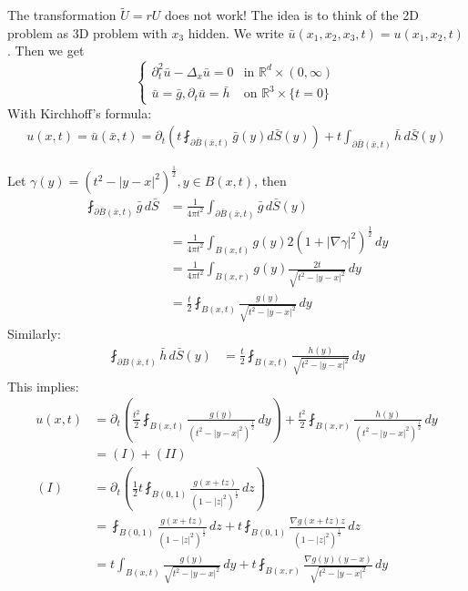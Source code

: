 \documentclass{report}
\theoremstyle{tommy}
\begin{document}
  The transformation \(\tilde U = r U\) does not work! The idea is to think of the 2D problem as 3D problem with \(x_3\) hidden. We write \(\bar u(x_1, x_2, x_3, t) = u(x_1, x_2, t)\). Then we get 
  \[\begin{cases}
    \partial_t^2 \bar u - \Delta_x \bar u = 0 &\text{in } \mathbb{R}^d \times (0,\infty) \\
    \bar u = \bar g, \partial_t \bar u = \bar h &\text{on } \mathbb{R}^3 \times \{t=0\}
  \end{cases}\]
  With Kirchhoff's formula:
  \begin{align*}
    u(x,t) = \bar u(\bar x,t) = \partial_t \left(t \fint_{\partial \bar B(\bar x, t)} \bar g(y) d \bar S(y)\right) + t \int_{\partial \bar B(\bar x, t)} \bar h \, d\bar S(y)
  \end{align*}

  Let \(\gamma(y) = (t^2 - |y-x|^2)^{\frac{1}{2}}, y \in B(x,t)\), then
  \begin{align*}
    \fint_{\partial \bar B(\bar x, t)} \bar g \, d\bar S &= \frac{1}{4 \pi t^2} \int_{\partial \bar B(\bar x, t)} \bar g \, d\bar S(y) \\
    &= \frac{1}{4 \pi t^2} \int_{B(x,t)} g(y) 2 (1 + |\nabla \gamma|^2)^{\frac{1}{2}} \, dy \\
    &= \frac{1}{4 \pi t^2} \int_{B(x,r)} g(y) \frac{2t}{\sqrt{t^2 - |y-x|^2}} \, dy \\
    &= \frac{t}{2} \fint_{B(x,t)} \frac{g(y)}{\sqrt{t^2 - |y-x|^2}} \, dy
  \end{align*}
  Similarly:
  \begin{align*}
    \fint_{\partial B(\bar x, t)} \bar h \, d\bar S(y) &= \frac{t}{2} \fint_{B(x,t)} \frac{h(y)}{\sqrt{t^2 - |y-x|^2}} \, dy
  \end{align*}
  This implies:
  \begin{align*}
    u(x,t) &= \partial_t \left(\frac{t^2}{2} \fint_{B(x,t)} \frac{g(y)}{(t^2-|y-x|^2)^{\frac{1}{2}}} \, dy\right) + \frac{t^2}{2} \fint_{B(x,r)} \frac{h(y)}{(t^2-|y-x|^2)^{\frac{1}{2}}} \, dy \\
    &= (I) + (II) \\
    (I) &= \partial_t \left(\frac{1}{2} t \fint_{B(0,1)} \frac{g(x+tz)}{(1-|z|^2)^{\frac{1}{2}}} \, dz\right) \\
    &= \fint_{B(0,1)} \frac{g(x+tz)}{(1-|z|^2)^{\frac{1}{2}}} \, dz + t \fint_{B(0,1)} \frac{\nabla g(x+tz) z}{(1-|z|^2)^{\frac{1}{2}}} \, dz \\
    &= t \int_{B(x,t)} \frac{g(y)}{\sqrt{t^2 - |y-x|^2}}\, dy + t \fint_{B(x,r)} \frac{\nabla g(y) (y-x)}{\sqrt{t^2 - |y-x|^2}} \, dy
  \end{align*}
\end{document}
